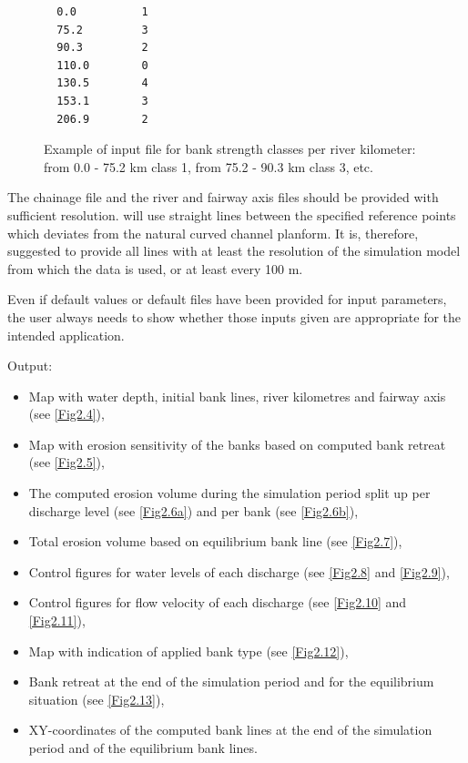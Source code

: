 \begin{figure}
\begin{Verbatim}
  0.0          1
  75.2         3
  90.3         2
  110.0        0
  130.5        4
  153.1        3
  206.9        2
\end{Verbatim}
\caption{Example of input file for bank strength classes per river kilometer: from 0.0 - 75.2 km class 1, from 75.2 - 90.3 km class 3, etc.}
\label{Fig2.3}
\end{figure}

\Note The chainage file and the river and fairway axis files should be provided with sufficient resolution.
\dfastbe will use straight lines between the specified reference points which deviates from the natural curved channel planform.
It is, therefore, suggested to provide all lines with at least the resolution of the simulation model from which the data is used, or at least every 100 m.

\Note Even if default values or default files have been provided for input parameters, the user always needs to show whether those inputs given are appropriate for the intended application.

Output:

\begin{itemize}
\item Map with water depth, initial bank lines, river kilometres and fairway axis (see \autoref{Fig2.4}),
\item Map with erosion sensitivity of the banks based on computed bank retreat (see \autoref{Fig2.5}),
\item The computed erosion volume during the simulation period split up per discharge level (see \autoref{Fig2.6a}) and per bank (see \autoref{Fig2.6b}),
\item Total erosion volume based on equilibrium bank line (see \autoref{Fig2.7}),
\item Control figures for water levels of each discharge (see \autoref{Fig2.8} and \autoref{Fig2.9}),
\item Control figures for flow velocity of each discharge (see \autoref{Fig2.10} and \autoref{Fig2.11}),
\item Map with indication of applied bank type (see \autoref{Fig2.12}),
\item Bank retreat at the end of the simulation period and for the equilibrium situation (see \autoref{Fig2.13}),
\item XY-coordinates of the computed bank lines at the end of the simulation period and of the equilibrium bank lines.
\end{itemize}


